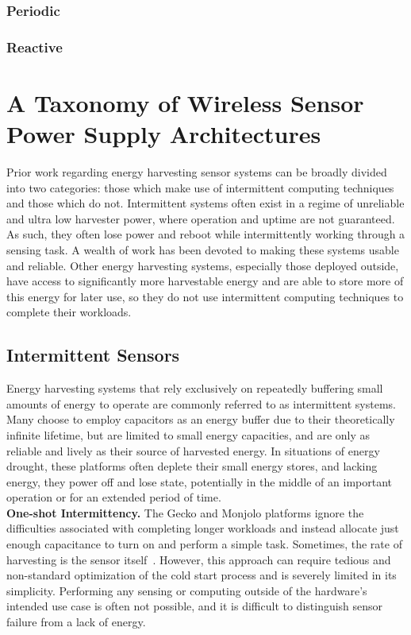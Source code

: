 \subsubsection{Periodic}

\subsubsection{Reactive}

\section{A Taxonomy of Wireless Sensor Power Supply Architectures}
\label{sec:intuition_related}

Prior work regarding energy harvesting sensor systems can be broadly
divided into two categories: those which make use of intermittent computing
techniques and those which do not.
Intermittent systems often exist in a regime of unreliable and ultra low harvester power, where
operation and uptime are not guaranteed. As such, they often lose power and
reboot while intermittently working through a sensing task.
A wealth of work has been devoted to
making these systems usable and reliable.
Other energy harvesting systems, especially those deployed outside, have access
to significantly more harvestable energy and are able to store more of this energy
for later use, so they
do not use intermittent computing techniques to complete their workloads.
\subsection{Intermittent Sensors}
\label{sec:related:intermittent}

Energy harvesting systems that rely
exclusively on repeatedly buffering small amounts of energy to
operate are commonly referred to as intermittent systems.
Many choose to employ
capacitors as an energy buffer due to their theoretically infinite lifetime,
but are limited to small energy capacities, and are only as reliable and
lively as their source of harvested energy.
In situations of energy drought, 
these platforms often deplete their 
small energy stores, and lacking energy,
they power off and lose
state, potentially in the middle of an important operation or for an extended
period of time.
\\

\vspace{-6pt}
\noindent
\textbf{One-shot Intermittency.}
The Gecko and Monjolo platforms ignore the difficulties associated with
completing longer workloads and instead allocate
just enough capacitance to turn on and perform a simple task. Sometimes, the
rate of harvesting is the sensor itself~\cite{campbellEnergy14,
yervaGrafting12, debruin2013monjolo}.  However, this approach can require
tedious and non-standard optimization of the cold start process and is severely
limited in its simplicity. Performing any sensing or computing outside of the
hardware's intended use case is often not possible,
and it is difficult to distinguish sensor failure from a lack of energy.
\\

